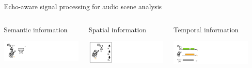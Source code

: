 \begin{frame}[t]{Echo-aware signal processing for \alert{audio scene analysis}}

    \begin{columns}
        \begin{column}[t]{0.3\textwidth}
            \centering
            \alert{Semantic} information

            \vspace*{0.5em}
            \includegraphics[trim={0 0 170em 0},clip,width=\textwidth]{figures/semantic.png}
        \end{column}
        \begin{column}[t]{0.3\textwidth}
            \centering
            \alert{Spatial} information

            \vspace*{0.5em}
            \includegraphics[trim={0 0 170em 0},clip,width=\textwidth]{figures/spatial.png}
        \end{column}
        \begin{column}[t]{0.3\textwidth}
            \centering
            \alert{Temporal} information

            \vspace*{0.5em}
            \includegraphics[trim={0 0 170em 0},clip,width=\textwidth]{figures/temporal.png}
        \end{column}
    \end{columns}


\end{frame}
